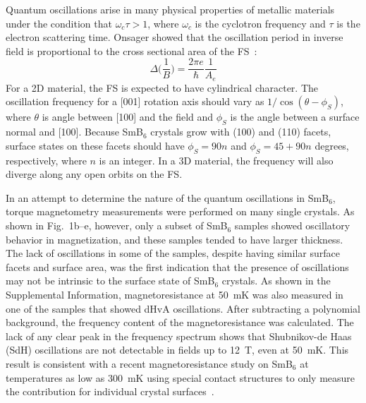 \documentclass[twocolumn,preprintnumbers,amsmath,amssymb]{revtex4}
\begin{document}
Quantum oscillations arise in many physical properties of metallic materials under the condition that $\omega_c\tau > 1$,
where $\omega_c$ is the cyclotron frequency and $\tau$ is the electron scattering time.
Onsager showed that the oscillation period in inverse field is proportional to the cross sectional area of the FS~\cite{Onsager1952}:
\begin{equation}
\Delta{}\bigg(\frac{1}{B}\bigg)=\frac{2\pi{}e}{\hbar{}}\frac{1}{A_{e}}
\end{equation}
For a 2D material, the FS is expected to have cylindrical character.
The oscillation frequency for a [001] rotation axis should vary as $1/\cos(\theta-\phi_S)$,
where $\theta$ is angle between [100] and the field and $\phi_S$ is the angle between a surface normal and [100].
Because SmB$_6$ crystals grow with (100) and (110) facets, surface states on these facets should have $\phi_S=90 n$ and $\phi_S=45+90n$ degrees, respectively, where $n$ is an integer.
In a 3D material, the frequency will also diverge along any open orbits on the FS.

In an attempt to determine the nature of the quantum oscillations in SmB$_6$, torque magnetometry measurements were performed on many single crystals.
As shown in Fig.~1b--e, however, only a subset of SmB$_6$ samples showed oscillatory behavior in magnetization, and these samples tended to have larger thickness.
The lack of oscillations in some of the samples, despite having similar surface facets and surface area, was the first indication that the presence of oscillations may not be 
intrinsic to the surface state of SmB$_6$ crystals.
As shown in the Supplemental Information, magnetoresistance at 50~mK was also measured in one of the samples that showed dHvA oscillations.
After subtracting a polynomial background, the frequency content of the magnetoresistance was calculated.
The lack of any clear peak in the frequency spectrum shows that Shubnikov-de Haas (SdH) oscillations are not detectable in fields up to 12~T, even at 50~mK.
This result is consistent with a recent magnetoresistance study on SmB$_6$ at temperatures as low as 300~mK using special contact structures to only measure the contribution for individual crystal surfaces~\cite{Wolgast2015}.
\end{document}
